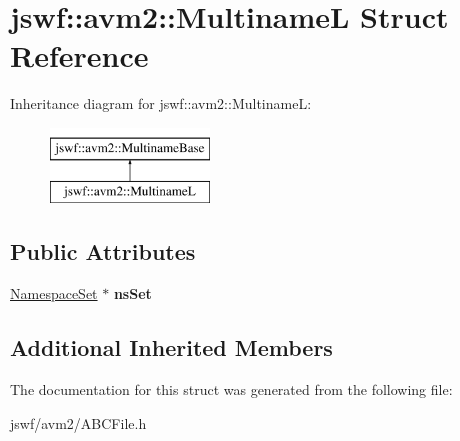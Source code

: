\hypertarget{structjswf_1_1avm2_1_1_multiname_l}{\section{jswf\+:\+:avm2\+:\+:Multiname\+L Struct Reference}
\label{structjswf_1_1avm2_1_1_multiname_l}
}
Inheritance diagram for jswf\+:\+:avm2\+:\+:Multiname\+L\+:\begin{figure}[H]
\begin{center}
\leavevmode
\includegraphics[height=2.000000cm]{structjswf_1_1avm2_1_1_multiname_l}
\end{center}
\end{figure}
\subsection*{Public Attributes}
\begin{DoxyCompactItemize}
\item 
\hypertarget{structjswf_1_1avm2_1_1_multiname_l_ac0a966a4866cd172dd7f186383edd112}{\hyperlink{structjswf_1_1avm2_1_1_namespace_set}{Namespace\+Set} $\ast$ {\bfseries ns\+Set}}\label{structjswf_1_1avm2_1_1_multiname_l_ac0a966a4866cd172dd7f186383edd112}

\end{DoxyCompactItemize}
\subsection*{Additional Inherited Members}


The documentation for this struct was generated from the following file\+:\begin{DoxyCompactItemize}
\item 
jswf/avm2/A\+B\+C\+File.\+h\end{DoxyCompactItemize}
